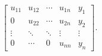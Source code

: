 \[\begin{bmatrix}u_{11}&u_{12}&\cdots&u_{1n}&y_{1}\\
0&u_{22}&\cdots&u_{2n}&y_{2}\\
\vdots&\ddots&\ddots&\vdots&\vdots\\
0&\cdots&0&u_{nn}&y_{n}\end{bmatrix}.\]